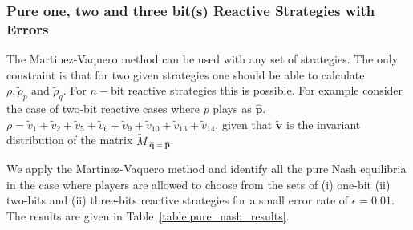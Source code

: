 \documentclass{article}
\theoremstyle{definition}
\begin{document}
\subsubsection{Pure one, two and three bit(s) Reactive Strategies with Errors}

The Martinez-Vaquero method can be used with any set of strategies. The only
constraint is that for two given strategies one should be able to calculate
\(\rho, \tilde{\rho}_p \text{ and } \tilde{\rho}_q\).
For \(n-\)bit reactive strategies this is possible. For example consider the
case of two-bit reactive cases where \(p\) plays as \(\mathbf{\hat{p}}\). \(\rho
= \tilde{v}_{1} + \tilde{v}_{2} + \tilde{v}_{5} + \tilde{v}_{6} + \tilde{v}_{9}
+  \tilde{v}_{10} + \tilde{v}_{13} + \tilde{v}_{14}\), given that
\(\mathbf{\tilde{v}}\) is the invariant distribution of the matrix
\(\tilde{M}_{|\mathbf{\hat{q}}=\mathbf{\hat{p}}}\).

We apply the Martinez-Vaquero method and identify all the pure Nash equilibria in the case where
players are allowed to choose from the sets of (i) one-bit (ii) two-bits and
(ii) three-bits reactive strategies for a small error rate of \(\epsilon=0.01\).
The results are given in Table~\ref{table:pure_nash_results}.
\end{document}
